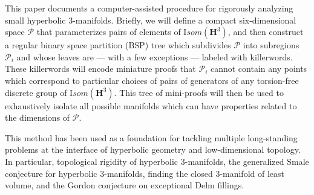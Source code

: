 


\textbf{}
\vskip 20pt

This paper documents a computer-assisted procedure
for rigorously analyzing small hyperbolic $3$-manifolds.
Briefly, we will define a compact six-dimensional space ${\mathcal P}$
that parameterizes pairs of elements of ${\mathrm Isom}({\mathbf H}^3)$,
and then construct a regular binary space partition (BSP) tree
which subdivides ${\mathcal P}$ into subregions ${\mathcal P_i}$
and whose leaves are --- with a few exceptions --- labeled with killerwords.
These killerwords will encode miniature proofs that ${\mathcal P_i}$
cannot contain any points which correspond to
particular choices of pairs of generators of
any torsion-free discrete group of ${\mathrm Isom}({\mathbf H}^3)$.
This tree of mini-proofs will then be used
to exhaustively isolate all possible manifolds
which can have properties related to the dimensions of ${\mathcal P}$.

This method has been used as a foundation for tackling multiple long-standing
problems at the interface of hyperbolic geometry and low-dimensional topology.
In particular,
	topological rigidity of hyperbolic $3$-manifolds,
	the generalized Smale conjecture for hyperbolic $3$-manifolds,
	finding the closed $3$-manifold of least volume,
	and the Gordon conjecture on exceptional Dehn fillings.
